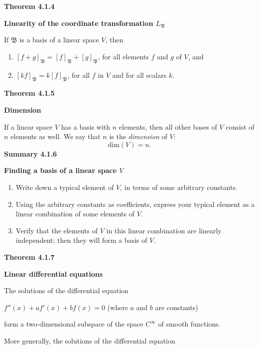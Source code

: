 \textbf{Theorem 4.1.4}\\
\par\noindent\textbf{Linearity of the coordinate transformation $L_{\mathfrak{B}}$}
\par\noindent If $\mathfrak{B}$ is a basis of a linear space $V$, then
\renewcommand{\labelenumi}{\textbf{\alph{enumi}.}}
\begin{enumerate}
\item $[f+g]_{\mathfrak{B}}=[f]_{\mathfrak{B}}+[g]_{\mathfrak{B}}$, for all elements $f$ and $g$ of $V$, and
\item $[kf]_{\mathfrak{B}}=k[f]_{\mathfrak{B}}$, for all $f$ in $V$ and for all scalars $k$.
\end{enumerate}
\textbf{Theorem 4.1.5}\\
\par\noindent\textbf{Dimension}
\par\noindent If a linear space $V$ has a basis with $n$ elements, then all other bases of $V$ consist of $n$ elements as well. We say that $n$ is the \textit{dimension} of $V$:
\[\textrm{dim}(V)=n.\]
\textbf{Summary 4.1.6}\\
\par\noindent\textbf{Finding a basis of a linear space $V$}
\renewcommand{\labelenumi}{\textbf{\alph{enumi}.}}
\begin{enumerate}
\item Write down a typical element of $V$, in terms of some arbitrary constants.
\item Using the arbitrary constants as coefficients, express your typical element as a linear combination of some elements of $V$.
\item Verify that the elements of $V$ in this linear combination are linearly independent; then they will form a basis of $V$.
\end{enumerate}
\textbf{Theorem 4.1.7}\\
\par\noindent\textbf{Linear differential equations}
\par\noindent The solutions of the differential equation
\par\noindent\begin{center}$f''(x)+af'(x)+bf(x)=0$ (where $a$ and $b$ are constants)\end{center}
\par\noindent form a two-dimensional subspace of the space $C^{\infty}$ of smooth functions.
\par\noindent More generally, the solutions of the differential equation
